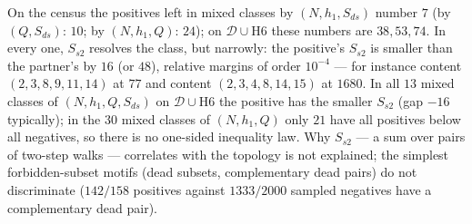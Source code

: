 \begin{observation}\label{obs:hard-positives}
On the census the positives left in mixed classes by $(N,h_1,S_{ds})$ number $7$ (by $(Q,S_{ds})$: $10$; by $(N,h_1,Q)$: $24$); on $\mathcal D\cup$H6 these numbers are $38,53,74$. In every one, $S_{s2}$ resolves the class, but narrowly: the positive's $S_{s2}$ is smaller than the partner's by $16$ (or $48$), relative margins of order $10^{-4}$ --- for instance content $(2,3,8,9,11,14)$ at $77$ and content $(2,3,4,8,14,15)$ at $1680$. In all $13$ mixed classes of $(N,h_1,Q,S_{ds})$ on $\mathcal D\cup$H6 the positive has the smaller $S_{s2}$ (gap $-16$ typically); in the $30$ mixed classes of $(N,h_1,Q)$ only $21$ have all positives below all negatives, so there is no one-sided inequality law. Why $S_{s2}$ --- a sum over pairs of two-step walks --- correlates with the topology is not explained; the simplest forbidden-subset motifs (dead subsets, complementary dead pairs) do not discriminate ($142/158$ positives against $1333/2000$ sampled negatives have a complementary dead pair).
\end{observation}

